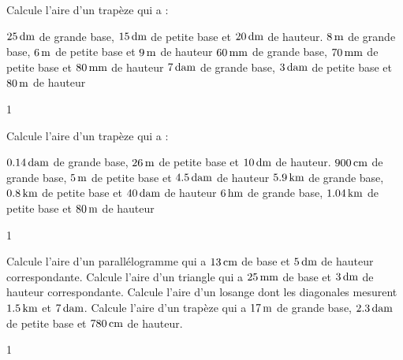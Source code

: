 \documentclass[a4paper,11pt]{report}
\begin{document}
\begin{exo}{    %
Calcule l'aire d'un trapèze qui a :
\begin{tasks}
	\task $\tunit{25}{dm}$ de grande base, $\tunit{15}{dm}$ de petite base et $\tunit{20}{dm}$ de hauteur.
	\task $\tunit{8}{m}$ de grande base, $\tunit{6}{m}$ de petite base et $\tunit{9}{m}$ de hauteur
	\task $\tunit{60}{mm}$ de grande base, $\tunit{70}{mm}$ de petite base et $\tunit{80}{mm}$ de hauteur
	\task $\tunit{7}{dam}$ de grande base, $\tunit{3}{dam}$ de petite base et $\tunit{80}{m}$ de hauteur
\end{tasks}
}{1}
\end{exo}

\begin{exo}{    %
Calcule l'aire d'un trapèze qui a :
\begin{tasks}
	\task $\tunit{0,14}{dam}$ de grande base, $\tunit{26}{m}$ de petite base et $\tunit{10}{dm}$ de hauteur.
	\task $\tunit{900}{cm}$ de grande base, $\tunit{5}{m}$ de petite base et $\tunit{4,5}{dam}$ de hauteur
	\task $\tunit{5,9}{km}$ de grande base, $\tunit{0,8}{km}$ de petite base et $\tunit{40}{dam}$ de hauteur
	\task $\tunit{6}{hm}$ de grande base, $\tunit{1,04}{km}$ de petite base et $\tunit{80}{m}$ de hauteur
\end{tasks}
}{1}
\end{exo}










\begin{exo}{ %
\begin{tasks}[after-item-skip = 0.3em]
	\task Calcule l'aire d'un parallélogramme qui a $\tunit{13}{cm}$ de base et $\tunit{5}{dm}$ de hauteur correspondante.
	\task Calcule l'aire d'un triangle qui a $\tunit{25}{mm}$ de base et $\tunit{3}{dm}$ de hauteur correspondante.
	\task  Calcule l'aire d'un losange dont les diagonales mesurent $\tunit{1,5}{km}$ et $\tunit{7}{dam}$.
	\task Calcule l'aire d'un trapèze qui a $\tunit{17}{m}$ de grande base, $\tunit{2,3}{dam}$ de petite base et $\tunit{780}{cm}$ de hauteur.
\end{tasks}
\vspace{-0.3cm}
}{1}    
\end{exo}
\end{document}
